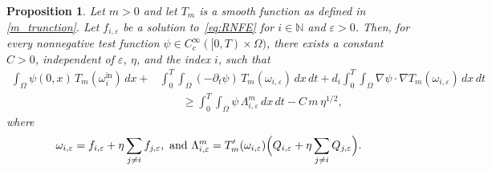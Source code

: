 \documentclass[a4paper,12pt,reqno]{amsart}
\theoremstyle{plain}
\newtheorem{prop}[thm]{Proposition}
\numberwithin{equation}{section}
\begin{document}
	\begin{prop}\label{control by time parameter}
		Let $m>0$ and let $T_m$ is a smooth function as defined in \eqref{m_trunction}. Let $f_{i,\varepsilon}$ be a solution to~\eqref{eq:RNFE} for $i \in \mathbb{N}$ and
		$\varepsilon > 0$. Then, for every nonnegative test function
		$\psi \in C_c^\infty([0,T)\times\Omega)$, there exists a constant $C > 0$, independent of
		$\varepsilon$, $\eta$, and the index $i$, such that
		\begin{align}\label{weak formulation on time}
			\int_{\Omega}\psi(0,x)\,T_m(\omega_i^{\mathrm{in}})\,dx
			+&
			\int_{0}^{T}\!\!\int_{\Omega}
			(-\partial_t\psi)\,T_m(\omega_{i,\varepsilon})\,dx\,dt
			+
			d_i\int_{0}^{T}\!\!\int_{\Omega}
			\nabla\psi\cdot\nabla T_m(\omega_{i,\varepsilon})\,dx\,dt \nonumber
			\\
			&\qquad\ge
			\int_{0}^{T}\!\!\int_{\Omega}
			\psi\,\Lambda^{m}_{i,\varepsilon}\,dx\,dt
			-
			C\,m\,\eta^{1/2},
		\end{align}
		where
		\[
		\omega_{i,\varepsilon}
		=
		f_{i,\varepsilon}
		+
		\eta \sum_{j\ne i} f_{j,\varepsilon},
		\ \text{and} \ 
		\Lambda^{m}_{i,\varepsilon}
		=
		T_m'(\omega_{i,\varepsilon})
		\Bigl(
		Q_{i,\varepsilon}
		+
		\eta \sum_{j\ne i} Q_{j,\varepsilon}
		\Bigr).
		\]
	\end{prop}
\end{document}
